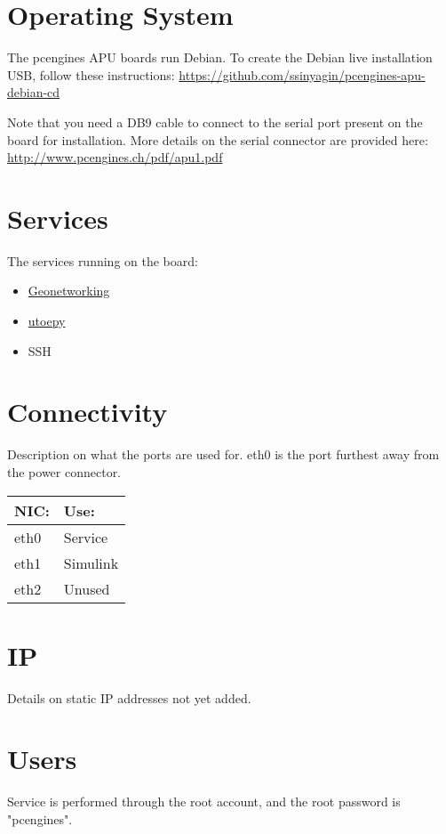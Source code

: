 \documentclass[11pt]{article}
\author{zev}
\date{\today}
\title{}
\begin{document}
\tableofcontents

\section{Operating System}
\label{sec:orgheadline1}
The pcengines APU boards run Debian. To create the Debian live
installation USB, follow these instructions:
\url{https://github.com/ssinyagin/pcengines-apu-debian-cd}

Note that you need a DB9 cable to connect to the serial port present
on the board for installation. More details on the serial connector
are provided here: \url{http://www.pcengines.ch/pdf/apu1.pdf}

\section{Services}
\label{sec:orgheadline2}
The services running on the board:
\begin{itemize}
\item \href{https://github.com/alexvoronov/geonetworking}{Geonetworking}
\item \href{https://github.com/alexvoronov/utoepy}{utoepy}
\item SSH
\end{itemize}

\section{Connectivity}
\label{sec:orgheadline3}
Description on what the ports are used for. eth0 is the port furthest
away from the power connector.

\begin{center}
\begin{tabular}{ll}
NIC: & Use:\\
\hline
eth0 & Service\\
eth1 & Simulink\\
eth2 & Unused\\
\end{tabular}
\end{center}

\section{IP}
\label{sec:orgheadline4}
Details on static IP addresses not yet added.

\section{Users}
\label{sec:orgheadline5}
Service is performed through the root account, and the root password
is "pcengines".
\end{document}
